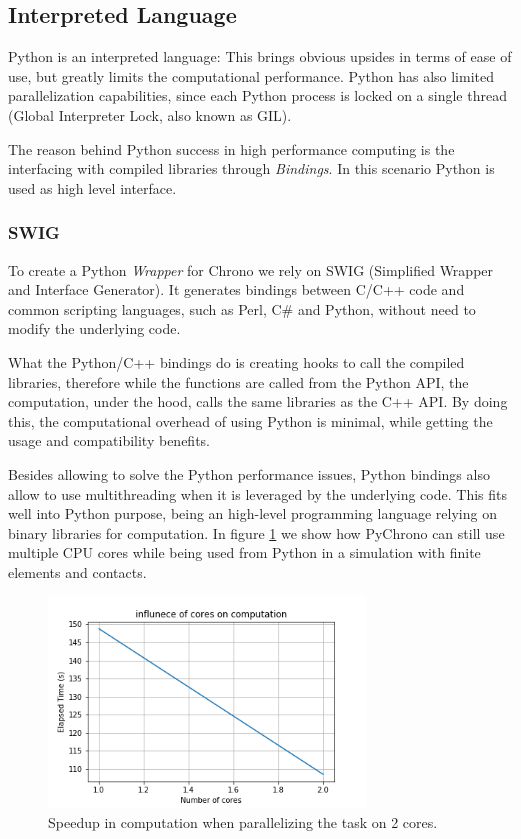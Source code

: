 \documentclass{svproc}
\begin{document}
\subsection{Interpreted Language}
Python is an interpreted language: This brings obvious upsides in terms of ease of use, but greatly limits the computational performance. Python has also limited parallelization capabilities, since each Python process is locked on a single thread (Global Interpreter Lock, also known as GIL).

The reason behind Python success in high performance computing is the interfacing with compiled libraries through \textit{Bindings}. In this scenario Python is used as high level interface.

\subsubsection{SWIG}
To create a Python \textit{Wrapper} for Chrono we rely on SWIG \cite{SWIG96} (Simplified Wrapper and Interface Generator). It generates bindings between C/C++ code and common scripting languages, such as Perl, C\# and Python, without need to modify the underlying code.

What the Python/C++ bindings do is creating hooks to call the compiled libraries, therefore while the functions are called from the Python API, the computation, under the hood, calls the same libraries as the C++ API. By doing this, the computational overhead of using Python is minimal, while getting the usage and compatibility benefits.

Besides allowing to solve the Python performance issues, Python bindings also allow to use multithreading when it is leveraged by the underlying code. This fits well into Python purpose, being an high-level programming language relying on binary libraries for computation.
In figure \ref{fig:OpenMP} we show how PyChrono can still use multiple CPU cores while being used from Python in a simulation with finite elements and contacts. 

\begin{figure}[ht]
\includegraphics[width=0.75\textwidth]{Figures/OpenMPtest.png}
\caption{Speedup in computation when parallelizing the task on 2 cores.}
\label{fig:OpenMP}
\end{figure}
\end{document}
